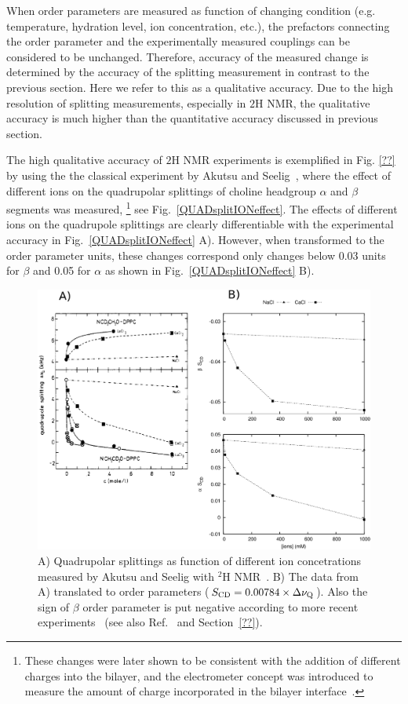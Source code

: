 \documentclass[aps,prl,superscriptaddress,twocolumn]{revtex4}
\begin{document}
When order parameters are measured as function of changing condition (e.g. temperature, hydration level, ion concentration, etc.), 
the prefactors connecting the order parameter and the experimentally measured couplings can be considered 
to be unchanged. Therefore, accuracy of the measured change is determined by the accuracy of the splitting measurement
in contrast to the previous section. Here we refer to this as a qualitative accuracy. Due to the high resolution of
splitting measurements, especially in $ 2$H NMR, the qualitative accuracy is much higher than the
quantitative accuracy discussed in previous section.

The high qualitative accuracy of $ 2$H NMR experiments is exemplified in Fig. \ref{??} by using the
the classical experiment by Akutsu and Seelig~\cite{akutsu81}, where the effect of different ions on 
the quadrupolar splittings of choline headgroup $\alpha$ and $\beta$ segments was measured, 
\footnote{These changes were later shown to be consistent with the addition of different charges into the bilayer, and the electrometer 
concept was introduced to measure the amount of charge incorporated in the bilayer interface~\cite{scherer89}.}
see Fig.~\ref{QUADsplitIONeffect}. 
The effects of different ions on the quadrupole splittings are clearly differentiable with the experimental 
accuracy in Fig.~\ref{QUADsplitIONeffect} A). However, when transformed to the order parameter units, 
these changes correspond only changes below 0.03 units for $\beta$ and 0.05 for $\alpha$ as shown in 
Fig.~\ref{QUADsplitIONeffect} B). 
\begin{figure}[]
  \includegraphics[width=17.2cm]{../Fig/QPandOPwithIONS.eps}
  \caption{\label{opIONeffect}
    A) Quadrupolar splittings as function of different ion concetrations measured by Akutsu and Seelig with $^2$H NMR~\cite{akutsu81}. 
    B) The data from A) translated to order parameters ($S_{{\rm CD}}=0.00784 \times \Delta \nu_{{\rm Q}}$). Also the sign of $\beta$ order parameter is put negative according
    to more recent experiments~\cite{??} (see also Ref.~\cite{botan15} and Section~\ref{??}).
  } 
\end{figure}
\end{document}
